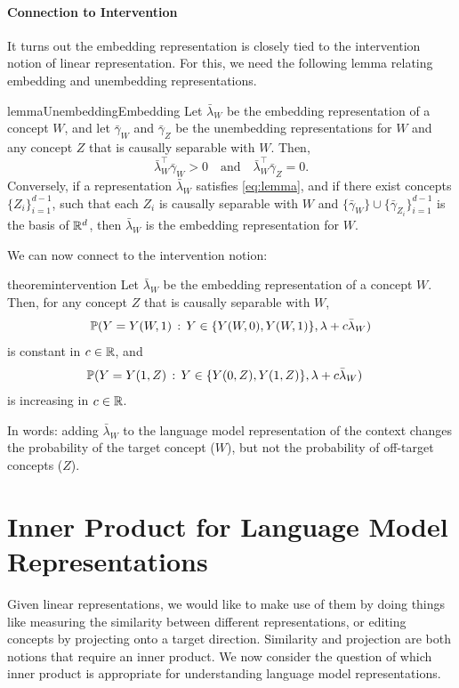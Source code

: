 \documentclass{article}
\theoremstyle{plain}
\theoremstyle{definition}
\theoremstyle{remark}
\begin{document}
\paragraph{Connection to Intervention}
It turns out the embedding representation is closely tied to the intervention notion of linear representation.
For this, we need the following lemma relating embedding and unembedding representations.
\begin{restatable}{lemma}{UnembeddingEmbedding}\label{lem:unembedding-embedding}
    Let $\bar{\lambda}_W$ be the embedding representation of a concept $W$, and let $\bar\gamma_W$ and $\bar\gamma_Z$ be the unembedding representations for $W$ and any concept $Z$ that is causally separable with $W$. Then,
    \begin{equation}\label{eq:lemma}
        \bar{\lambda}_W^\top \bar{\gamma}_W > 0 \quad \text{and}\quad \bar{\lambda}_W^\top \bar{\gamma}_Z = 0 .
    \end{equation}
    Conversely, if a representation $\bar\lambda_W$ satisfies \eqref{eq:lemma}, and if there exist concepts $\{Z_i\}_{i=1}^{d-1}$, such that each $Z_i$ is causally separable with $W$ and $\{\bar\gamma_W\}\cup\{\bar\gamma_{Z_i}\}_{i=1}^{d-1}$ is the basis of $\mathbb{R}^d$, then $\bar\lambda_W$ is the embedding representation for $W$.
\end{restatable}

We can now connect to the intervention notion:
\begin{restatable}{theorem}{intervention}
    \label{thm:intervention}
    Let $\bar{\lambda}_W$ be the embedding representation of a concept $W$. 
    Then, for any concept $Z$ that is causally separable with $W$,
    \begin{align*}
        \Pr(Y = Y(W, 1) \given Y\in\{Y(W, 0),Y(W, 1)\}, \lambda + c \bar{\lambda}_W)
    \end{align*}
    is constant in $c \in \mathbb{R}$, and
    \begin{align*}
        &\Pr(Y = Y(1, Z) \given Y\in\{Y(0, Z),Y(1, Z)\}, \lambda + c \bar{\lambda}_W)
    \end{align*}
    is increasing in $c \in \mathbb{R}$.
\end{restatable}
In words: adding $\bar{\lambda}_W$ to the language model representation of the context changes the probability of the target concept ($W$), but not the probability of off-target concepts ($Z$).


\section{Inner Product for Language Model Representations}\label{sec:inner_product}
Given linear representations, we would like to make use of them by doing things like measuring the similarity between different representations, or editing concepts by projecting onto a target direction.
Similarity and projection are both notions that require an inner product. 
We now consider the question of which inner product is appropriate for understanding language model representations.
\end{document}
